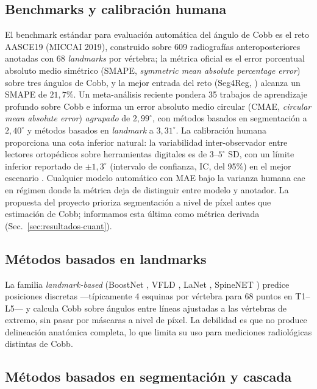 \documentclass[conference]{IEEEtran}
\begin{document}
\subsection{Benchmarks y calibración humana}
\label{sec:soa-benchmarks}

El benchmark estándar para evaluación automática del ángulo de Cobb es el reto AASCE19 \cite{aasce19} (MICCAI 2019), construido sobre 609 radiografías anteroposteriores anotadas con 68 \emph{landmarks} por vértebra; la métrica oficial es el error porcentual absoluto medio simétrico (SMAPE, \emph{symmetric mean absolute percentage error}) sobre tres ángulos de Cobb, y la mejor entrada del reto (Seg4Reg, \cite{seg4reg}) alcanza un SMAPE de $21{,}7\%$. Un meta-análisis reciente \cite{meta_cobb} pondera 35 trabajos de aprendizaje profundo sobre Cobb e informa un error absoluto medio circular (CMAE, \emph{circular mean absolute error}) \emph{agrupado} de $2{,}99^{\circ}$, con métodos basados en segmentación a $2{,}40^{\circ}$ y métodos basados en \emph{landmark} a $3{,}31^{\circ}$. La calibración humana proporciona una cota inferior natural: la variabilidad inter-observador entre lectores ortopédicos sobre herramientas digitales es de $3$--$5^{\circ}$ SD, con un límite inferior reportado de $\pm 1{,}3^{\circ}$ (intervalo de confianza, IC, del 95\%) en el mejor escenario \cite{cobb_interrater}. Cualquier modelo automático con MAE bajo la varianza humana cae en régimen donde la métrica deja de distinguir entre modelo y anotador. La propuesta del proyecto prioriza segmentación a nivel de píxel antes que estimación de Cobb; informamos esta última como métrica derivada (Sec.~\ref{sec:resultados-cuant}).

\subsection{Métodos basados en landmarks}
\label{sec:soa-landmarks}

La familia \emph{landmark-based} (BoostNet \cite{boostnet}, VFLD \cite{vfld}, LaNet \cite{lanet}, SpineNET \cite{spinenet}) predice posiciones discretas ---típicamente 4 esquinas por vértebra para 68 puntos en T1--L5--- y calcula Cobb sobre ángulos entre líneas ajustadas a las vértebras de extremo, sin pasar por máscaras a nivel de píxel. La debilidad es que no produce delineación anatómica completa, lo que limita su uso para mediciones radiológicas distintas de Cobb.

\subsection{Métodos basados en segmentación y cascada}
\label{sec:soa-seg-cascade}
\end{document}
